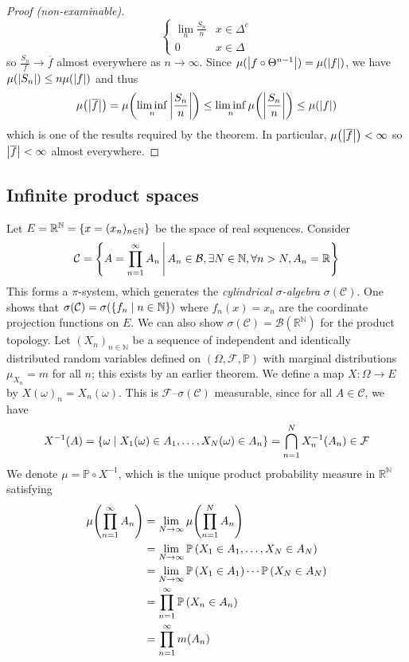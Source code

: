 \begin{proof}[Proof (non-examinable)]
\[\begin{cases}
        \lim_n \frac{S_n}{n} & x \in \Delta^c \\
        0 & x \in \Delta
    \end{cases} \]
    so \( \frac{S_n}{f} \to \overline f \) almost everywhere as \( n \to \infty \).
    Since \( \mu(\abs{f \circ \Theta^{n-1}}) = \mu(\abs{f}) \), we have \( \mu(\abs{S_n}) \leq n \mu(\abs{f}) \) and thus
    \[ \mu\qty(\abs{\overline f}) = \mu\qty(\liminf_n \abs{\frac{S_n}{n}}) \leq \liminf_n \mu\qty(\abs{\frac{S_n}{n}}) \leq \mu(\abs{f}) \]
    which is one of the results required by the theorem.
    In particular, \( \mu\qty(\abs{\overline f}) < \infty \) so \( \abs{\overline f} < \infty \) almost everywhere.
\end{proof}

\subsection{Infinite product spaces}
Let \( E = \mathbb R^{\mathbb N} = \qty{x = (x_n)_{n \in \mathbb N}} \) be the space of real sequences.
Consider
\[ \mathcal C = \qty{A = \prod_{n=1}^\infty A_n \,\middle|\,A_n \in \mathcal B, \exists N \in \mathbb N, \forall n > N, A_n = \mathbb R} \]
This forms a \( \pi \)-system, which generates the \emph{cylindrical \( \sigma \)-algebra} \( \sigma(\mathcal C) \).
One shows that \( \sigma(\mathcal C) = \sigma(\qty{f_n \mid n \in \mathbb N}) \) where \( f_n(x) = x_n \) are the coordinate projection functions on \( E \).
We can also show \( \sigma(\mathcal C) = \mathcal B(\mathbb R^{\mathbb N}) \) for the product topology.
Let \( (X_n)_{n \in \mathbb N} \) be a sequence of independent and identically distributed random variables defined on \( (\Omega, \mathcal F, \mathbb P) \) with marginal distributions \( \mu_{X_n} = m \) for all \( n \); this exists by an earlier theorem.
We define a map \( X \colon \Omega \to E \) by \( X(\omega)_n = X_n(\omega) \).
This is \( \mathcal F \)--\( \sigma(\mathcal C) \) measurable, since for all \( A \in \mathcal C \), we have
\[ X^{-1}(A) = \qty{\omega \mid X_1(\omega) \in A_1, \dots, X_N(\omega) \in A_n} = \bigcap_{n=1}^N X_n^{-1}(A_n) \in \mathcal F \]
We denote \( \mu = \mathbb P \circ X^{-1} \), which is the unique product probability measure in \( \mathbb R^{\mathbb N} \) satisfying
\begin{align*}
		\mu\qty(\prod_{n=1}^\infty A_n) &= \lim_{N \to \infty} \mu\qty(\prod_{n=1}^N A_n) \\
		&= \lim_{N \to \infty} \mathbb{P}\left({X_1 \in A_1, \dots, X_N \in A_N}\right) \\
		&= \lim_{N \to \infty} \mathbb{P}\left({X_1 \in A_1}\right) \cdots \mathbb{P}\left({X_N \in A_N}\right) \\
		&= \prod_{n=1}^\infty \mathbb{P}\left({X_n \in A_n}\right) \\
		&= \prod_{n=1}^\infty m(A_n)
\end{align*}
